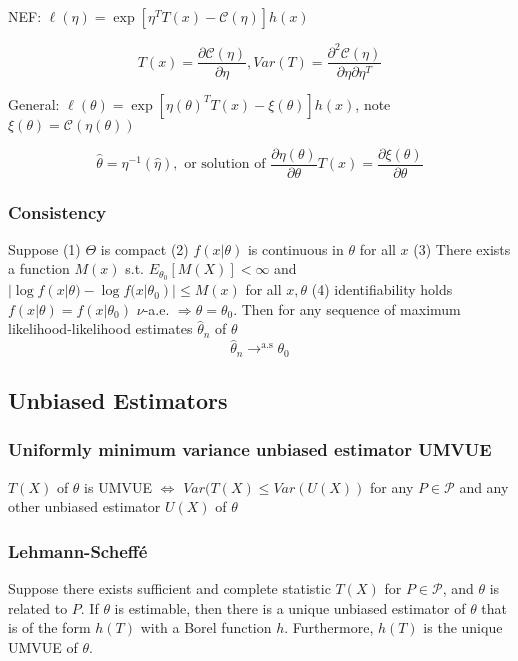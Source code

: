 NEF: $\ell(\eta)=\exp\left[\eta^T T(x) - \mathcal{C}(\eta) \right]h(x)$

$$
T(x) = \frac{\partial\mathcal{C}(\eta)}{\partial\eta},
Var(T) = \frac{\partial^2\mathcal{C}(\eta)}{\partial\eta\partial\eta^T}
$$

General: $\ell(\theta) = \exp \left[\eta(\theta)^T T(x) - \xi(\theta)\right]h(x)$, note $\xi(\theta) = \mathcal{C}(\eta(\theta))$

$$
\hat\theta = \eta^{-1}(\hat\eta), \text{ or solution of }
\frac{\partial\eta(\theta)}{\partial\theta}T(x) = \frac{\partial\xi(\theta)}{\partial\theta}
$$

\subsubsection{Consistency}

Suppose (1) $\Theta$ is compact (2) $f(x|\theta)$ is continuous in $\theta$ for all $x$ (3) There exists a function $M(x)$ s.t. $E_{\theta_0}[M(X)]<\infty$ and $|\log f(x|\theta) - \log f(x|\theta_0)| \leq M(x)$ for all $x, \theta$ (4) identifiability holds $f(x|\theta)=f(x|\theta_0)$ $\nu$-a.e. $\Rightarrow \theta = \theta_0$. Then for any sequence of maximum likelihood-likelihood estimates $\hat\theta_n$ of $\theta$
$$
\hat\theta_n \rightarrow^{\text{a.s}} \theta_0
$$

\subsection{Unbiased Estimators}

\subsubsection{Uniformly minimum variance unbiased estimator UMVUE}

$T(X)$ of $\theta$ is UMVUE $\Leftrightarrow$
$Var(T(X)\leq Var(U(X))$ for any $P\in\mathcal{P}$ and any other unbiased estimator $U(X)$ of $\theta$

\subsubsection{Lehmann-Scheffé}

Suppose there exists sufficient and complete statistic $T(X)$ for $P\in\mathcal{P}$, and $\theta$ is related to $P$. If $\theta$ is estimable, then there is a unique unbiased estimator of $\theta$ that is of the form $h(T)$ with a Borel function $h$. Furthermore, $h(T)$ is the unique UMVUE of $\theta$.

